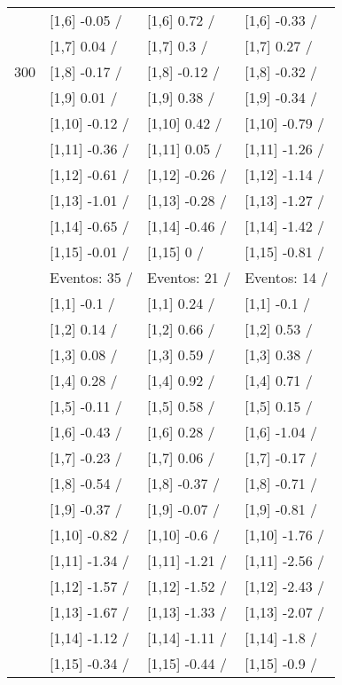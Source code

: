 \begin{table}
\begin{tabular}[t]{llll}
 & {}[1,6] -0.05  / & {}[1,6] 0.72  / & {}[1,6] -0.33  /\\
 & {}[1,7] 0.04  / & {}[1,7] 0.3  / & {}[1,7] 0.27  /\\
300 & {}[1,8] -0.17  / & {}[1,8] -0.12  / & {}[1,8] -0.32  /\\
\addlinespace
 & {}[1,9] 0.01  / & {}[1,9] 0.38  / & {}[1,9] -0.34  /\\
 & {}[1,10] -0.12  / & {}[1,10] 0.42  / & {}[1,10] -0.79  /\\
 & {}[1,11] -0.36  / & {}[1,11] 0.05  / & {}[1,11] -1.26  /\\
 & {}[1,12] -0.61  / & {}[1,12] -0.26  / & {}[1,12] -1.14  /\\
 & {}[1,13] -1.01  / & {}[1,13] -0.28  / & {}[1,13] -1.27  /\\
\addlinespace
 & {}[1,14] -0.65  / & {}[1,14] -0.46  / & {}[1,14] -1.42  /\\
 & {}[1,15] -0.01  / & {}[1,15] 0  / & {}[1,15] -0.81  /\\
 & Eventos:  35 / & Eventos:  21 / & Eventos:  14 /\\
 & {}[1,1] -0.1  / & {}[1,1] 0.24  / & {}[1,1] -0.1  /\\
 & {}[1,2] 0.14  / & {}[1,2] 0.66  / & {}[1,2] 0.53  /\\
\addlinespace
 & {}[1,3] 0.08  / & {}[1,3] 0.59  / & {}[1,3] 0.38  /\\
 & {}[1,4] 0.28  / & {}[1,4] 0.92  / & {}[1,4] 0.71  /\\
 & {}[1,5] -0.11  / & {}[1,5] 0.58  / & {}[1,5] 0.15  /\\
 & {}[1,6] -0.43  / & {}[1,6] 0.28  / & {}[1,6] -1.04  /\\
 & {}[1,7] -0.23  / & {}[1,7] 0.06  / & {}[1,7] -0.17  /\\
\addlinespace
500 & {}[1,8] -0.54  / & {}[1,8] -0.37  / & {}[1,8] -0.71  /\\
 & {}[1,9] -0.37  / & {}[1,9] -0.07  / & {}[1,9] -0.81  /\\
 & {}[1,10] -0.82  / & {}[1,10] -0.6  / & {}[1,10] -1.76  /\\
 & {}[1,11] -1.34  / & {}[1,11] -1.21  / & {}[1,11] -2.56  /\\
 & {}[1,12] -1.57  / & {}[1,12] -1.52  / & {}[1,12] -2.43  /\\
\addlinespace
 & {}[1,13] -1.67  / & {}[1,13] -1.33  / & {}[1,13] -2.07  /\\
 & {}[1,14] -1.12  / & {}[1,14] -1.11  / & {}[1,14] -1.8  /\\
 & {}[1,15] -0.34  / & {}[1,15] -0.44  / & {}[1,15] -0.9  /\\
\bottomrule
\end{tabular}
\end{table}

